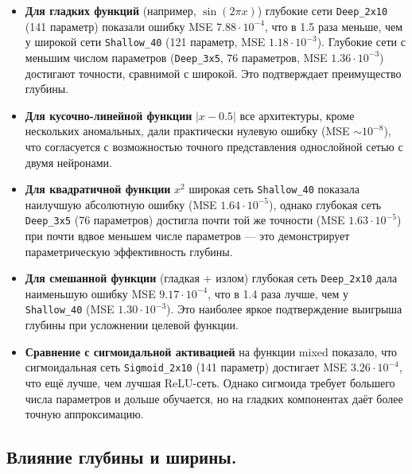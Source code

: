 \documentclass[12pt]{article}
\begin{document}
	\begin{itemize}
		\item \textbf{Для гладких функций} (например, $\sin(2\pi x)$) глубокие сети \texttt{Deep\_2x10} (141 параметр) показали ошибку MSE $7.88\cdot10^{-4}$, что в 1.5 раза меньше, чем у широкой сети \texttt{Shallow\_40} (121 параметр, MSE $1.18\cdot10^{-3}$). Глубокие сети с меньшим числом параметров (\texttt{Deep\_3x5}, 76 параметров, MSE $1.36\cdot10^{-3}$) достигают точности, сравнимой с широкой. Это подтверждает преимущество глубины.
		\item \textbf{Для кусочно-линейной функции} $|x-0.5|$ все архитектуры, кроме нескольких аномальных, дали практически нулевую ошибку (MSE $\sim10^{-8}$), что согласуется с возможностью точного представления однослойной сетью с двумя нейронами.
		\item \textbf{Для квадратичной функции} $x^2$ широкая сеть \texttt{Shallow\_40} показала наилучшую абсолютную ошибку (MSE $1.64\cdot10^{-5}$), однако глубокая сеть \texttt{Deep\_3x5} (76 параметров) достигла почти той же точности (MSE $1.63\cdot10^{-5}$) при почти вдвое меньшем числе параметров — это демонстрирует параметрическую эффективность глубины.
		\item \textbf{Для смешанной функции} (гладкая + излом) глубокая сеть \texttt{Deep\_2x10} дала наименьшую ошибку MSE $9.17\cdot10^{-4}$, что в 1.4 раза лучше, чем у \texttt{Shallow\_40} (MSE $1.30\cdot10^{-3}$). Это наиболее яркое подтверждение выигрыша глубины при усложнении целевой функции.
		\item \textbf{Сравнение с сигмоидальной активацией} на функции mixed показало, что сигмоидальная сеть \texttt{Sigmoid\_2x10} (141 параметр) достигает MSE $3.26\cdot10^{-4}$, что ещё лучше, чем лучшая ReLU-сеть. Однако сигмоида требует большего числа параметров и дольше обучается, но на гладких компонентах даёт более точную аппроксимацию.
	\end{itemize}
	
	\subsection*{Влияние глубины и ширины.}
	
\end{document}
